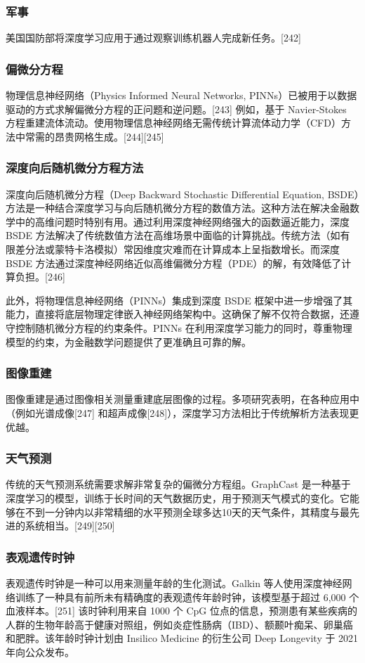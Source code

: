 \subsubsection{军事}  
美国国防部将深度学习应用于通过观察训练机器人完成新任务。[242]  
\subsubsection{偏微分方程}  
物理信息神经网络（Physics Informed Neural Networks, PINNs）已被用于以数据驱动的方式求解偏微分方程的正问题和逆问题。[243] 例如，基于 Navier-Stokes 方程重建流体流动。使用物理信息神经网络无需传统计算流体动力学（CFD）方法中常需的昂贵网格生成。[244][245]  
\subsubsection{深度向后随机微分方程方法}  
深度向后随机微分方程（Deep Backward Stochastic Differential Equation, BSDE）方法是一种结合深度学习与向后随机微分方程的数值方法。这种方法在解决金融数学中的高维问题时特别有用。通过利用深度神经网络强大的函数逼近能力，深度 BSDE 方法解决了传统数值方法在高维场景中面临的计算挑战。传统方法（如有限差分法或蒙特卡洛模拟）常因维度灾难而在计算成本上呈指数增长。而深度 BSDE 方法通过深度神经网络近似高维偏微分方程（PDE）的解，有效降低了计算负担。[246]  

此外，将物理信息神经网络（PINNs）集成到深度 BSDE 框架中进一步增强了其能力，直接将底层物理定律嵌入神经网络架构中。这确保了解不仅符合数据，还遵守控制随机微分方程的约束条件。PINNs 在利用深度学习能力的同时，尊重物理模型的约束，为金融数学问题提供了更准确且可靠的解。  
\subsubsection{图像重建}  
图像重建是通过图像相关测量重建底层图像的过程。多项研究表明，在各种应用中（例如光谱成像[247] 和超声成像[248]），深度学习方法相比于传统解析方法表现更优越。  
\subsubsection{天气预测}  
传统的天气预测系统需要求解非常复杂的偏微分方程组。GraphCast 是一种基于深度学习的模型，训练于长时间的天气数据历史，用于预测天气模式的变化。它能够在不到一分钟内以非常精细的水平预测全球多达10天的天气条件，其精度与最先进的系统相当。[249][250]  
\subsubsection{表观遗传时钟}  
表观遗传时钟是一种可以用来测量年龄的生化测试。Galkin 等人使用深度神经网络训练了一种具有前所未有精确度的表观遗传年龄时钟，该模型基于超过 6,000 个血液样本。[251] 该时钟利用来自 1000 个 CpG 位点的信息，预测患有某些疾病的人群的生物年龄高于健康对照组，例如炎症性肠病（IBD）、额颞叶痴呆、卵巢癌和肥胖。该年龄时钟计划由 Insilico Medicine 的衍生公司 Deep Longevity 于 2021 年向公众发布。

